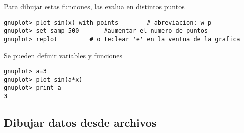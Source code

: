 Para dibujar estas funciones, las evalua en distintos puntos
\begin{lstlisting}
gnuplot> plot sin(x) with points 		# abreviacion: w p
gnuplot> set samp 500 		#aumentar el numero de puntos
gnuplot> replot 		# o teclear 'e' en la ventna de la grafica
\end{lstlisting}

Se pueden definir variables y funciones 
\begin{lstlisting}
gnuplot> a=3
gnuplot> plot sin(a*x)
gnuplot> print a
3
\end{lstlisting}

\subsection{Dibujar datos desde archivos}

